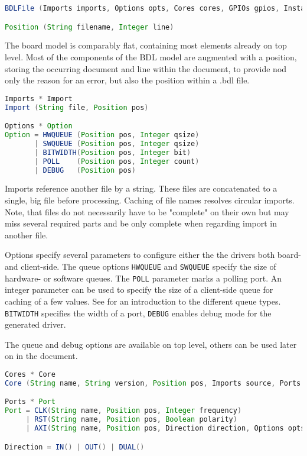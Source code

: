 \documentclass{report}
\begin{document}
\begin{lstlisting}[language=java, breaklines=true]
BDLFile (Imports imports, Options opts, Cores cores, GPIOs gpios, Instances insts, Medium medium, Scheduler scheduler)

Position (String filename, Integer line)
\end{lstlisting}

The board model is comparably flat, containing most elements already on top level. Most of the components of the BDL model are augmented with a position, storing the occurring document and line within the document, to provide nod only the reason for an error, but also the position within a .bdl file.

\begin{lstlisting}[language=java, breaklines=true]
Imports * Import
Import (String file, Position pos)

Options * Option
Option = HWQUEUE (Position pos, Integer qsize)
       | SWQUEUE (Position pos, Integer qsize)
       | BITWIDTH(Position pos, Integer bit)
       | POLL    (Position pos, Integer count)
       | DEBUG   (Position pos)
\end{lstlisting}

Imports reference another file by a string. These files are concatenated to a single, big file before processing. Caching of file names resolves circular imports. Note, that files do not necessarily have to be "complete" on their own but may miss several required parts and be only complete when regarding import in another file.

Options specify several parameters to configure either the the drivers both board- and client-side. The queue options \texttt{HWQUEUE} and \texttt{SWQUEUE} specify the size of hardware- or software queues. The \texttt{POLL} parameter marks a polling port. An integer parameter can be used to specify the size of a client-side queue for caching of a few values. See  for an introduction to the different queue types.
\texttt{BITWIDTH} specifies the width of a port, \texttt{DEBUG} enables debug mode for the generated driver.

The queue and debug options are available on top level, others can be used later on in the document.

\begin{lstlisting}[language=java, breaklines=true]
Cores * Core
Core (String name, String version, Position pos, Imports source, Ports ports)

Ports * Port
Port = CLK(String name, Position pos, Integer frequency)
     | RST(String name, Position pos, Boolean polarity)
     | AXI(String name, Position pos, Direction direction, Options opts)

Direction = IN() | OUT() | DUAL()
\end{lstlisting}
\end{document}
